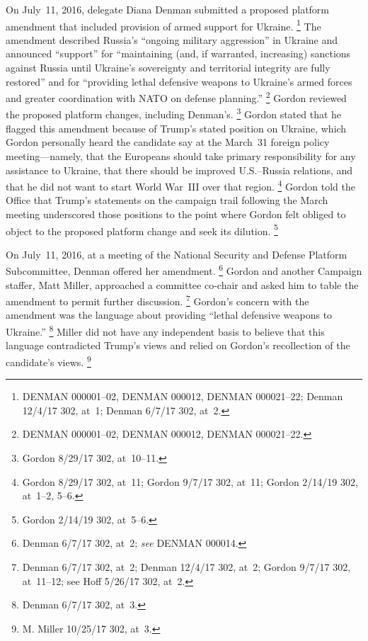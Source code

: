On July~11, 2016, delegate Diana Denman submitted a proposed platform amendment that included provision of armed support for Ukraine.%
\footnote{DENMAN 000001--02, DENMAN 000012, DENMAN 000021--22;
Denman 12/4/17 302, at~1;
Denman 6/7/17 302, at~2.}
The amendment described Russia's ``ongoing military aggression'' in Ukraine and announced ``support'' for ``maintaining (and, if warranted, increasing) sanctions against Russia until Ukraine's sovereignty and territorial integrity are fully restored'' and for ``providing lethal defensive weapons to Ukraine's armed forces and greater coordination with NATO on defense planning.''%
\footnote{DENMAN 000001--02, DENMAN 000012, DENMAN 000021--22.}
Gordon reviewed the proposed platform changes, including Denman's.%
\footnote{Gordon 8/29/17 302, at~10--11.}
Gordon stated that he flagged this amendment because of Trump's stated position on Ukraine, which Gordon personally heard the candidate say at the March~31 foreign policy meeting---namely, that the Europeans should take primary responsibility for any assistance to Ukraine, that there should be improved U.S.--Russia relations, and that he did not want to start World War~III over that region.%
\footnote{Gordon 8/29/17 302, at~11;
Gordon 9/7/17 302, at~11;
Gordon 2/14/19 302, at~1--2, 5--6.}
Gordon told the Office that Trump's statements on the campaign trail following the March meeting underscored those positions to the point where Gordon felt obliged to object to the proposed platform change and seek its dilution.%
\footnote{Gordon 2/14/19 302, at~5--6.}

On July~11, 2016, at a meeting of the National Security and Defense Platform Subcommittee, Denman offered her amendment.%
\footnote{Denman 6/7/17 302, at~2;
\textit{see} DENMAN 000014.}
Gordon and another Campaign staffer, Matt Miller, approached a committee co-chair and asked him to table the amendment to permit further discussion.%
\footnote{Denman 6/7/17 302, at~2;
Denman 12/4/17 302, at~2;
Gordon 9/7/17 302, at~11--12;
see Hoff 5/26/17 302, at~2.}
Gordon's concern with the amendment was the language about providing ``lethal defensive weapons to Ukraine.''%
\footnote{Denman 6/7/17 302, at~3.}
Miller did not have any independent basis to believe that this language contradicted Trump's views and relied on Gordon's recollection of the candidate's views.%
\footnote{M. Miller 10/25/17 302, at~3.}

